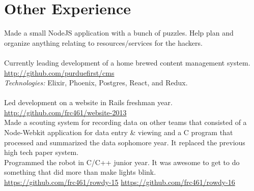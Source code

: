\documentclass[11pt,letter,sans]{moderncv}
\begin{document}
\section{Other Experience}
Made a small NodeJS application with a bunch of puzzles.
Help plan and organize anything relating to resources/services for the hackers.
\\
\\
Currently leading development of a home brewed content management system. \url{http://github.com/purduefirst/cms}
\\
\textit{Technologies:} Elixir, Phoenix, Postgres, React, and Redux.
\\
\\
Led development on a website in Rails freshman year. \url{http://github.com/frc461/website-2013}
\\
Made a scouting system for recording data on other teams that consisted of a Node-Webkit application for data entry \& viewing and a C program that processed and summarized the data sophomore year.
It replaced the previous high tech paper system.
\\
Programmed the robot in C/C++ junior year.
It was awesome to get to do something that did more than make lights blink.
\url{https://github.com/frc461/rowdy-15} \url{https://github.com/frc461/rowdy-16}
\\
\\
\end{document}

